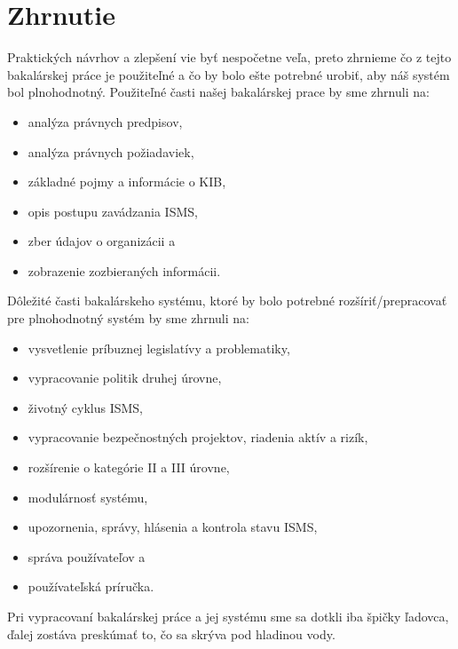\section{Zhrnutie}
Praktických návrhov a zlepšení vie byť nespočetne veľa, preto zhrnieme čo z tejto bakalárskej práce je použiteľné a čo
by bolo ešte potrebné urobiť, aby náš systém bol plnohodnotný. Použiteľné časti našej bakalárskej prace by sme zhrnuli
na:
\begin{itemize}
  \item analýza právnych predpisov,
  \item analýza právnych požiadaviek,
  \item základné pojmy a informácie o KIB,
  \item opis postupu zavádzania ISMS,
  \item zber údajov o organizácii a
  \item zobrazenie zozbieraných informácii.
\end{itemize}
Dôležité časti bakalárskeho systému, ktoré by bolo potrebné rozšíriť/prepracovať pre plnohodnotný systém by sme zhrnuli
na:
\begin{itemize}
  \item vysvetlenie príbuznej legislatívy a problematiky,
  \item vypracovanie politik druhej úrovne,
  \item životný cyklus ISMS,
  \item vypracovanie bezpečnostných projektov, riadenia aktív a rizík,
  \item rozšírenie o kategórie II a III úrovne,
  \item modulárnosť systému,
  \item upozornenia, správy, hlásenia a kontrola stavu ISMS,
  \item správa používateľov a
  \item používateľská príručka.
\end{itemize}

Pri vypracovaní bakalárskej práce a jej systému sme sa dotkli iba špičky ľadovca, ďalej zostáva preskúmať to, čo sa skrýva
pod hladinou vody.

